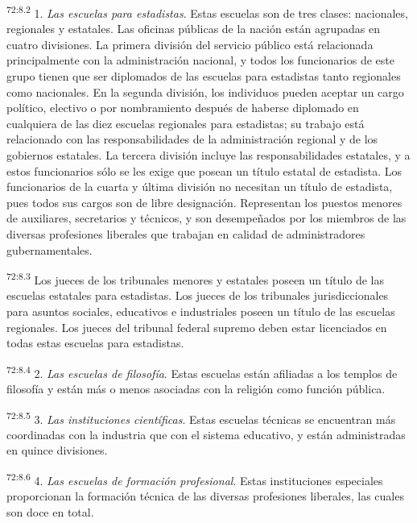 \documentclass[twoside, 11pt]{book}
\begin{document}
\par
\textsuperscript{72:8.2} 1. \textit{Las escuelas para estadistas}. Estas escuelas son de tres clases: nacionales, regionales y estatales. Las oficinas públicas de la nación están agrupadas en cuatro divisiones. La primera división del servicio público está relacionada principalmente con la administración nacional, y todos los funcionarios de este grupo tienen que ser diplomados de las escuelas para estadistas tanto regionales como nacionales. En la segunda división, los individuos pueden aceptar un cargo político, electivo o por nombramiento después de haberse diplomado en cualquiera de las diez escuelas regionales para estadistas; su trabajo está relacionado con las responsabilidades de la administración regional y de los gobiernos estatales. La tercera división incluye las responsabilidades estatales, y a estos funcionarios sólo se les exige que posean un título estatal de estadista. Los funcionarios de la cuarta y última división no necesitan un título de estadista, pues todos sus cargos son de libre designación. Representan los puestos menores de auxiliares, secretarios y técnicos, y son desempeñados por los miembros de las diversas profesiones liberales que trabajan en calidad de administradores gubernamentales.

\par
\textsuperscript{72:8.3} Los jueces de los tribunales menores y estatales poseen un título de las escuelas estatales para estadistas. Los jueces de los tribunales jurisdiccionales para asuntos sociales, educativos e industriales poseen un título de las escuelas regionales. Los jueces del tribunal federal supremo deben estar licenciados en todas estas escuelas para estadistas.

\par
\textsuperscript{72:8.4} 2. \textit{Las escuelas de filosofía}. Estas escuelas están afiliadas a los templos de filosofía y están más o menos asociadas con la religión como función pública.

\par
\textsuperscript{72:8.5} 3. \textit{Las instituciones científicas}. Estas escuelas técnicas se encuentran más coordinadas con la industria que con el sistema educativo, y están administradas en quince divisiones.

\par
\textsuperscript{72:8.6} 4. \textit{Las escuelas de formación profesional}. Estas instituciones especiales proporcionan la formación técnica de las diversas profesiones liberales, las cuales son doce en total.
\end{document}
